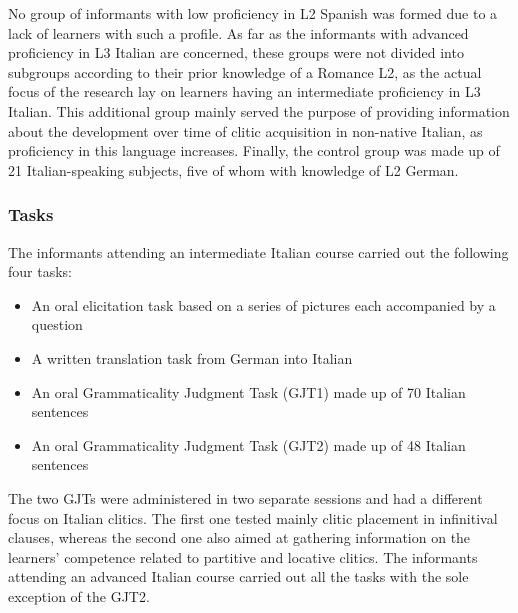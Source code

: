 \documentclass[output=paper,modfonts,nonflat,newtxmath]{langsci/langscibook}
\begin{document}
No group of informants with low proficiency in L2 Spanish was formed due to a lack of learners with such a profile. As far as the informants with advanced proficiency in L3 Italian are concerned, these groups were not divided into subgroups according to their prior knowledge of a Romance L2, as the actual focus of the research lay on learners having an intermediate proficiency in L3 Italian. This additional group mainly served the purpose of providing information about the development over time of clitic acquisition in non-native Italian, as proficiency in this language increases. Finally, the control group was made up of 21 Italian-speaking subjects, five of whom with knowledge of L2 German.

   \subsubsection{Tasks} %

The informants attending an intermediate Italian course carried out the following four tasks:

\begin{itemize}
\item
An oral elicitation task based on a series of pictures each accompanied by a question

\item
A written translation task from German into Italian

\item
An oral Grammaticality Judgment Task (GJT1) made up of 70 Italian sentences

\item
An oral Grammaticality Judgment Task (GJT2) made up of 48 Italian sentences

\end{itemize}

The two GJTs were administered in two separate sessions and had a different focus on Italian clitics. The first one tested mainly clitic placement in infinitival clauses, whereas the second one also aimed at gathering information on the learners’ competence related to partitive and locative clitics. The informants attending an advanced Italian course carried out all the tasks with the sole exception of the GJT2.
\end{document}
